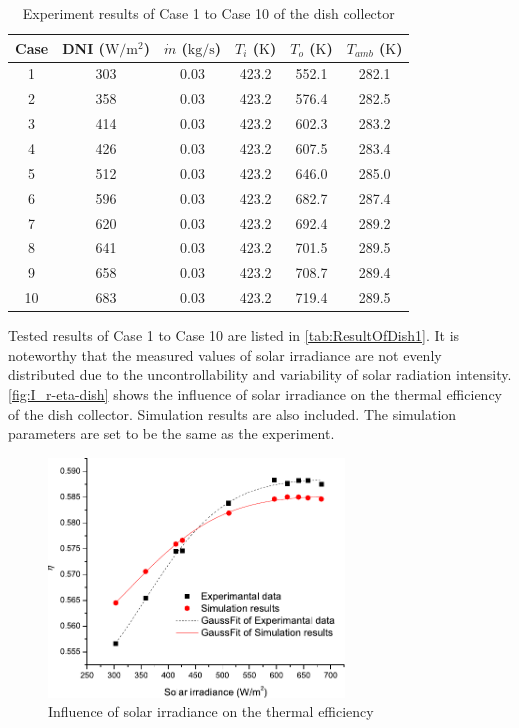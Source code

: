 \begin{table}[htbp]
	\caption{Experiment results of Case 1 to Case 10 of the dish collector}
	\centering
	\begin{tabular}{cccccc}
		\toprule
		Case	& DNI ($\mathrm{W/m^2}$)	&	$\dot{m}$ ($\mathrm{kg/s}$)			&	$T_i$ ($\mathrm{K}$)	&	$T_o$ ($\mathrm{K}$)		&	$T_{amb}$ ($\mathrm{K}$)\\
		\midrule
		1	&	303	&	0.03	&	423.2	&	552.1	&	282.1\\
		2	&	358	&	0.03	&	423.2	&	576.4	&	282.5\\
		3	&	414	&	0.03	&	423.2	&	602.3	&	283.2	\\
		4	&	426	&	0.03	&	423.2	&	607.5	&	283.4\\
		5	&	512	&	0.03	&	423.2	&	646.0	&	285.0\\
		6	&	596	&	0.03	&	423.2	&	682.7	&	287.4\\
		7	&	620	&	0.03	&	423.2	&	692.4	&	289.2\\
		8	&	641	&	0.03	&	423.2	&	701.5	&	289.5\\
		9	&	658	&	0.03	&	423.2	&	708.7	&	289.4\\
		10	&	683	&	0.03	&	423.2	&	719.4	&	289.5\\
		\bottomrule
	\end{tabular}
	
	\label{tab:ResultOfDish1}
\end{table}
Tested results of Case 1 to Case 10 are listed in \autoref{tab:ResultOfDish1}. It is noteworthy that the measured values of solar irradiance are not evenly distributed due to the uncontrollability and variability of solar radiation intensity.
\autoref{fig:I_r-eta-dish} shows the influence of solar irradiance on the thermal efficiency of the dish collector. Simulation results are also included. The simulation parameters are set to be the same as the experiment. 
\begin{figure}[!ht]
\centering
\includegraphics[width=0.7\textwidth]{fig/I_r-eta-dish}
\caption{Influence of solar irradiance on the thermal efficiency}
\label{fig:I_r-eta-dish}
\end{figure}

